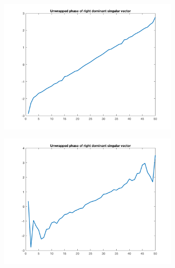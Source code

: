 \begin{figure}[htpb]
\begin{subfigure}{.25\textwidth}
\end{subfigure}
\quad
\begin{subfigure}{.25\textwidth}
\includegraphics[width=1\textwidth]{img/Hoge1DXSigma0}
\end{subfigure}%
\begin{subfigure}{.25\textwidth}
\includegraphics[width=1\textwidth]{img/Hoge1DXSigma75}
\end{subfigure}%
\begin{subfigure}{.25\textwidth}

\end{subfigure}
\end{figure}
